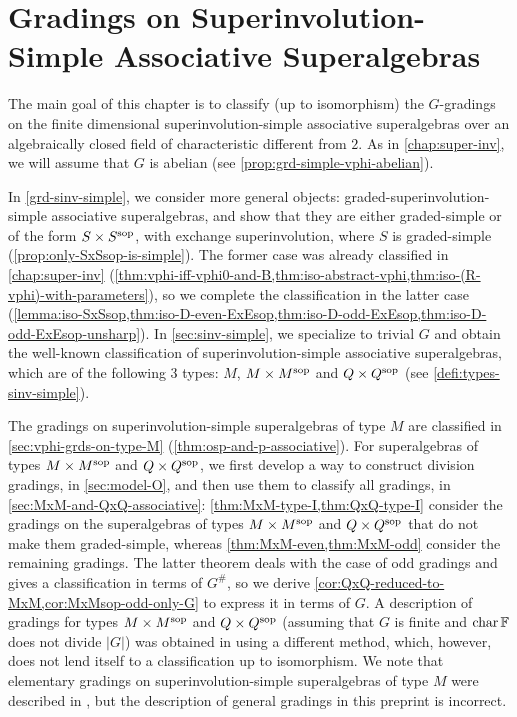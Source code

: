 \chapter[Gradings on Superinvolution-Simple Associative Superalgebras]
{Gradings on Superinvolution-\texorpdfstring{ }{}Simple Associative Superalgebras}\label{chap:grds-sinv-simple}

The main goal of this chapter is to classify (up to isomorphism) the $G$-gradings on the finite dimensional superinvolution-simple associative superalgebras over an algebraically closed field of characteristic different from $2$. 
As in \cref{chap:super-inv}, we will assume that $G$ is abelian (see \cref{prop:grd-simple-vphi-abelian}). 

In \cref{grd-sinv-simple}, we consider more general objects: graded-superinvolution-simple associative superalgebras, and show that they are either graded-simple or of the form $S\times S^{\mathrm{sop}}$, with exchange superinvolution, where $S$ is graded-simple (\cref{prop:only-SxSsop-is-simple}). 
The former case was already classified in \cref{chap:super-inv} (\cref{thm:vphi-iff-vphi0-and-B,thm:iso-abstract-vphi,thm:iso-(R-vphi)-with-parameters}), so we complete the classification in the latter case (\cref{lemma:iso-SxSsop,thm:iso-D-even-ExEsop,thm:iso-D-odd-ExEsop,thm:iso-D-odd-ExEsop-unsharp}). 
In \cref{sec:sinv-simple}, we specialize to trivial $G$ and obtain the well-known classification of superinvolution-simple associative superalgebras, which are of the following $3$ types: $M$, $M\times M^{\mathrm{sop}}$ and $Q\times Q^{\mathrm{sop}}$ (see \cref{defi:types-sinv-simple}). 

The gradings on superinvolution-simple superalgebras of type $M$ are classified in \cref{sec:vphi-grds-on-type-M} (\cref{thm:osp-and-p-associative}). 
For superalgebras of types $M\times M^{\mathrm{sop}}$ and $Q\times Q^{\mathrm{sop}}$, we first develop a way to construct division gradings, in \cref{sec:model-O}, and then use them to classify all gradings, in \cref{sec:MxM-and-QxQ-associative}: 
\cref{thm:MxM-type-I,thm:QxQ-type-I} consider the gradings on the superalgebras of types $M\times M^{\mathrm{sop}}$ and $Q\times Q^{\mathrm{sop}}$ that do not make them graded-simple, whereas  
\cref{thm:MxM-even,thm:MxM-odd} consider the remaining gradings. 
The latter theorem deals with the case of odd gradings and gives a classification in terms of $G^\#$, so we derive
\cref{cor:QxQ-reduced-to-MxM,cor:MxMsop-odd-only-G} to express it in terms of $G$. 
A description of gradings for types $M\times M^{\mathrm{sop}}$ and $Q\times Q^{\mathrm{sop}}$ (assuming that $G$ is finite and $\operatorname{char} \mathbb{F}$ does not divide $|G|$) was obtained in \cite[Theorems 4 and 5]{BTT} using a different method, which, however, does not lend itself to a classification up to isomorphism. 
We note that elementary gradings on superinvolution-simple superalgebras of type $M$ were described in \cite[Theorems 5.2 and 5.3]{TT}, but the description of general gradings in this preprint is incorrect.  

